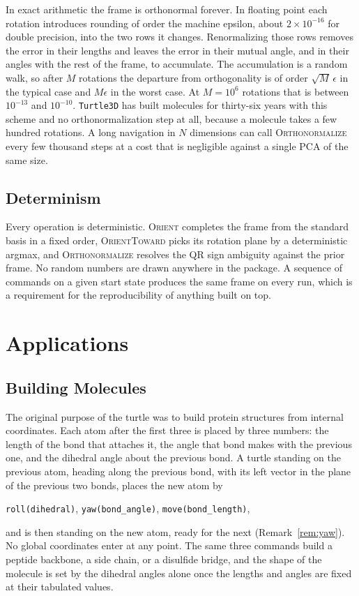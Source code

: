 \documentclass[11pt,letterpaper]{article}
\newcommand{\code}[1]{\texttt{#1}}
\newcommand{\op}[1]{\textup{\textsc{#1}}}
\begin{document}
In exact arithmetic the frame is orthonormal forever. In floating
point each rotation introduces rounding of order the machine epsilon,
about $2 \times 10^{-16}$ for double precision, into the two rows it
changes. Renormalizing those rows removes the error in their lengths
and leaves the error in their mutual angle, and in their angles with
the rest of the frame, to accumulate. The accumulation is a random
walk, so after $M$ rotations the departure from orthogonality is of
order $\sqrt{M}\,\epsilon$ in the typical case and $M\epsilon$ in the
worst case. At $M = 10^6$ rotations that is between $10^{-13}$ and
$10^{-10}$. \code{Turtle3D} has built molecules for thirty-six years
with this scheme and no orthonormalization step at all, because a
molecule takes a few hundred rotations. A long navigation in $N$
dimensions can call \op{Orthonormalize} every few thousand steps
at a cost that is negligible against a single PCA of the same size.

\subsection{Determinism}

Every operation is deterministic. \op{Orient} completes the frame
from the standard basis in a fixed order, \op{OrientToward} picks
its rotation plane by a deterministic argmax, and
\op{Orthonormalize} resolves the QR sign ambiguity against the
prior frame. No random numbers are drawn anywhere in the package. A
sequence of commands on a given start state produces the same frame on
every run, which is a requirement for the reproducibility of anything
built on top.

\section{Applications}
\label{sec:applications}

\subsection{Building Molecules}
\label{sec:molecules}

The original purpose of the turtle was to build protein structures
from internal coordinates. Each atom after the first three is placed by
three numbers: the length of the bond that attaches it, the angle that
bond makes with the previous one, and the dihedral angle about the
previous bond. A turtle standing on the previous atom, heading along
the previous bond, with its left vector in the plane of the previous
two bonds, places the new atom by
\begin{center}
\code{roll(dihedral)}, \quad \code{yaw(bond\_angle)}, \quad \code{move(bond\_length)},
\end{center}
and is then standing on the new atom, ready for the next
(Remark~\ref{rem:yaw}). No global coordinates enter at any point. The
same three commands build a peptide backbone, a side chain, or a
disulfide bridge, and the shape of the molecule is set by the dihedral
angles alone once the lengths and angles are fixed at their
tabulated values.
\end{document}

